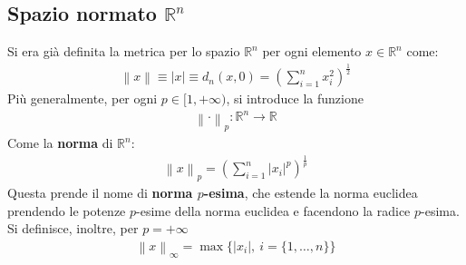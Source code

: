 \documentclass[a4paper, oneside]{book}
\begin{document}
\subsection{Spazio normato $\mathbb{R}^{n}$}
Si era già definita la metrica per lo spazio $\mathbb{R}^{n}$ per ogni elemento $x \in \mathbb{R}^{n}$  come:
\begin{align}
    \left\lVert x \right\rVert \equiv \left| x \right| \equiv d_n(x, 0) = \left(\sum_{i = 1}^{n} x_i^{2} \right)^{\frac{1}{2}}  
\end{align}
Più generalmente, per ogni $p \in [1, +\infty)$, si introduce la funzione
\begin{align}
    \left\lVert \cdot  \right\rVert _p : \mathbb{R}^{n} \to \mathbb{R}
\end{align}
Come la \textbf{norma} di $\mathbb{R}^{n}$:
\begin{align}
    \left\lVert x \right\rVert _p = \left(\sum_{i = 1}^{n} \left| x_i \right|^{p} \right)^{\frac{1}{p}}
\end{align}
Questa prende il nome di \textbf{norma $p$-esima}, che estende la norma 
euclidea prendendo le potenze $p$-esime della norma euclidea e facendono la 
radice $p$-esima. Si definisce, inoltre, per $p = + \infty $ 
\begin{align}
    \left\lVert x \right\rVert _{\infty } = \max  \{\left| x_i \right|, \ i = \{1, \dots, n\} \}
\end{align}
\end{document}
